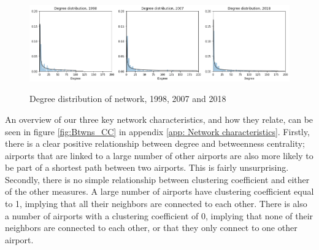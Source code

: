 \begin{figure}[H]
  \centering
  \caption{Degree distribution of network, 1998, 2007 and 2018}
    \includegraphics[width=1 \textwidth]{Exam/Figures/degree_distributionv2.png}
  \label{fig:degree_distribution}
\end{figure}
An overview of our three key network characteristics, and how they relate, can be seen in figure \ref{fig:Btwns_CC} in appendix \ref{app: Network characteristics}. Firstly, there is a clear positive relationship between degree and betweenness centrality; airports that are linked to a large number of other airports are also more likely to be part of a shortest path between two airports. This is fairly unsurprising. Secondly, there is no simple relationship between clustering coefficient and either of the other measures. A large number of airports have clustering coefficient equal to 1, implying that all their neighbors are connected to each other. There is also a number of airports with a clustering coefficient of 0, implying that none of their neighbors are connected to each other, or that they only connect to one other airport. 

